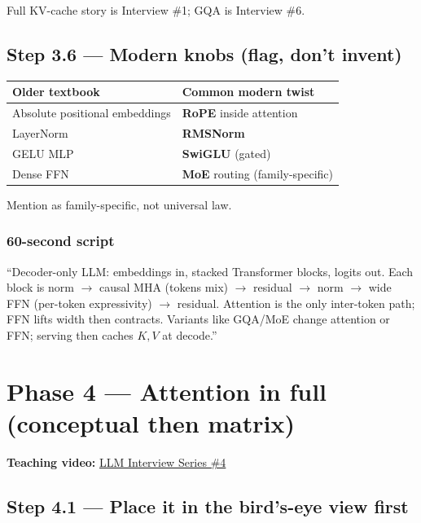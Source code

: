 \documentclass[11pt,a4paper]{article}
\begin{document}
Full KV-cache story is Interview \#1; GQA is Interview \#6.


\subsection{Step 3.6 --- Modern knobs (flag, don't invent)}


\begin{table}[ht]
\centering\small
\begin{tabularx}{\textwidth}{@{}YY@{}}
\toprule
\textbf{Older textbook} & \textbf{Common modern twist} \\
\midrule
Absolute positional embeddings & \textbf{RoPE} inside attention \\
LayerNorm & \textbf{RMSNorm} \\
GELU MLP & \textbf{SwiGLU} (gated) \\
Dense FFN & \textbf{MoE} routing (family-specific) \\
\bottomrule
\end{tabularx}
\end{table}


Mention as family-specific, not universal law.


\subsubsection{60-second script}

``Decoder-only LLM: embeddings in, stacked Transformer blocks, logits out. Each block is norm $\rightarrow$ causal MHA (tokens mix) $\rightarrow$ residual $\rightarrow$ norm $\rightarrow$ wide FFN (per-token expressivity) $\rightarrow$ residual. Attention is the only inter-token path; FFN lifts width then contracts. Variants like GQA/MoE change attention or FFN; serving then caches \(K,V\) at decode.''


\bigskip


\clearpage
\section{Phase 4 --- Attention in full (conceptual then matrix)}


\textbf{Teaching video:} \href{https://www.youtube.com/watch?v=cquX2tOODUI}{LLM Interview Series \#4}


\subsection{Step 4.1 --- Place it in the bird's-eye view first}
\end{document}

